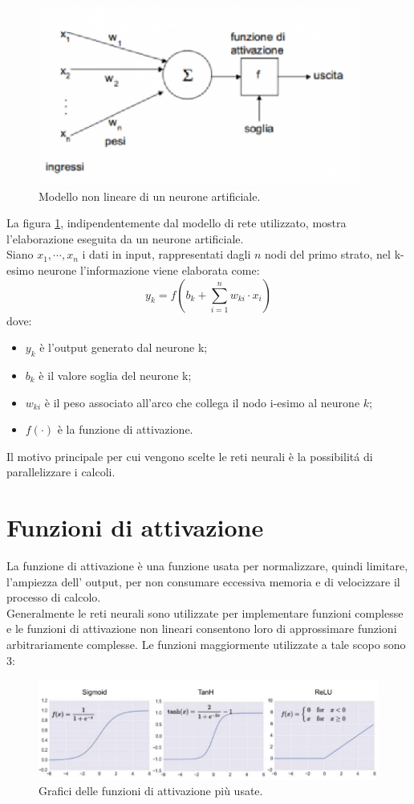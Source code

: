 \documentclass[a4paper,12pt,oneside]{book}
\begin{document}
\begin{figure}[!h]
\centering
\includegraphics[scale=1.8]{reteneurale.eps}
\caption{Modello non lineare di un neurone artificiale.}
\label{neurone}
\end{figure}

La figura \ref{neurone}, indipendentemente dal modello di rete utilizzato, mostra l'elaborazione eseguita da un neurone artificiale.\\
Siano $x_1,\cdots,x_n$ i dati in input, rappresentati dagli $n$ nodi del primo strato, nel k-esimo neurone l'informazione viene elaborata come:
$$y_k=f(b_k+\sum_{i=1}^n w_{ki}\cdot x_i)$$
dove:\\
\begin{itemize}
\item $y_k$ \`e l'output generato dal neurone k;
\item $b_k$ \`e il valore soglia del neurone k;
\item $w_{ki}$ \`e il peso associato all'arco che collega il nodo i-esimo al neurone $k$;
\item $f(\cdot)$ \`e la funzione di attivazione.
\end{itemize}
Il motivo principale per cui vengono scelte le reti neurali \`e la possibilit\'{a} di parallelizzare i calcoli.
\newpage
\section{Funzioni di attivazione}
La funzione di attivazione \`e una funzione usata per normalizzare, quindi limitare, l'ampiezza dell' output, per non consumare eccessiva memoria e di velocizzare il processo di calcolo.\\
Generalmente le reti neurali sono utilizzate per implementare funzioni complesse e le funzioni di attivazione non lineari consentono loro di approssimare funzioni arbitrariamente complesse. Le funzioni maggiormente utilizzate a tale scopo sono 3:
\begin{figure}[!h]
\includegraphics[scale=0.7]{funzioniAttivazione}
\caption{Grafici delle funzioni di attivazione pi\`{u} usate.}
\end{figure}
\end{document}
